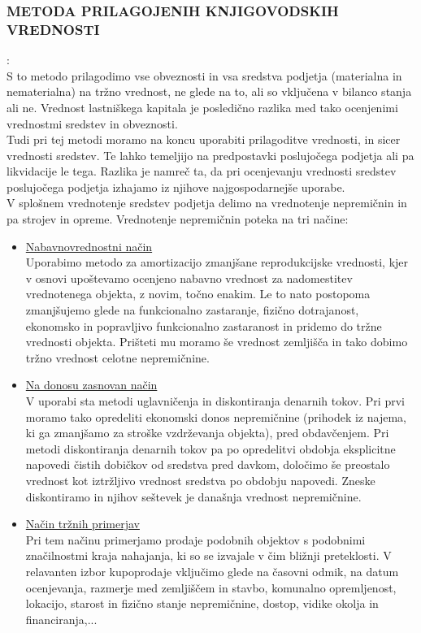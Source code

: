 \documentclass[12pt,a4paper]{amsart}
\theoremstyle{definition} %
\theoremstyle{plain} %
\begin{document}
\subsubsection{METODA PRILAGOJENIH KNJIGOVODSKIH VREDNOSTI}:\\
S to metodo prilagodimo vse obveznosti in vsa sredstva podjetja (materialna in nematerialna) na tržno vrednost, ne glede na to, ali so vključena v bilanco stanja ali ne. Vrednost lastniškega kapitala je posledično razlika med tako ocenjenimi vrednostmi sredstev in obveznosti.\\
Tudi pri tej metodi moramo na koncu uporabiti prilagoditve vrednosti, in sicer vrednosti sredstev. Te lahko temeljijo na predpostavki poslujočega podjetja ali pa likvidacije le tega. Razlika je namreč ta, da pri ocenjevanju vrednosti sredstev poslujočega podjetja izhajamo iz njihove najgospodarnejše uporabe.\\
V splošnem vrednotenje sredstev podjetja delimo na vrednotenje nepremičnin in pa strojev in opreme. Vrednotenje nepremičnin poteka na tri načine:
\begin{itemize}
\item \underline{Nabavnovrednostni način}\\
Uporabimo metodo za amortizacijo zmanjšane reprodukcijske vrednosti, kjer v osnovi upoštevamo ocenjeno nabavno vrednost za nadomestitev vrednotenega objekta, z novim, točno enakim. Le to nato postopoma zmanjšujemo glede na funkcionalno zastaranje, fizično dotrajanost, ekonomsko in popravljivo funkcionalno zastaranost in pridemo do tržne vrednosti objekta. Prišteti mu moramo še vrednost zemljišča in tako dobimo tržno vrednost celotne nepremičnine.
\item \underline{ Na donosu zasnovan način}\\
V uporabi sta metodi uglavničenja in diskontiranja denarnih tokov. Pri prvi moramo tako opredeliti ekonomski donos nepremičnine (prihodek iz najema, ki ga zmanjšamo za stroške vzdrževanja objekta), pred obdavčenjem. Pri metodi diskontiranja denarnih tokov pa po opredelitvi obdobja eksplicitne napovedi čistih dobičkov od sredstva pred davkom, določimo še preostalo vrednost kot iztržljivo vrednost sredstva po obdobju napovedi. Zneske diskontiramo in njihov seštevek je današnja vrednost nepremičnine.
\item \underline{Način tržnih primerjav}\\
Pri tem načinu primerjamo prodaje podobnih objektov s podobnimi značilnostmi kraja nahajanja, ki so se izvajale v čim bližnji preteklosti. V relavanten izbor kupoprodaje vključimo glede na časovni odmik, na datum ocenjevanja, razmerje med zemljiščem in stavbo, komunalno opremljenost, lokacijo, starost in fizično stanje nepremičnine, dostop, vidike okolja in financiranja,... 
\end{itemize}
\end{document}
